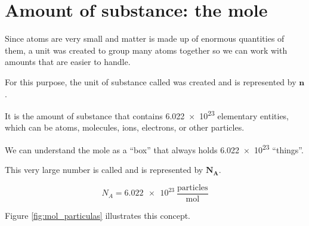 \section{Amount of substance: the mole}

Since atoms are very small and matter is made up of enormous quantities of them, a unit was created to group many atoms together so we can work with amounts that are easier to handle.

For this purpose, the unit of substance called  was created and is represented by \( \bm{n} \).

\begin{definition}[Mole]
    It is the amount of substance that contains \num{6.022e23} elementary entities, which can be atoms, molecules, ions, electrons, or other particles.
\end{definition}

We can understand the mole as a ``box'' that always holds \num{6.022e23} ``things''.

This very large number is called  and is represented by \( \bm{N_A} \).

\begin{equation*}
    N_A = \num{6.022e23}\ \dfrac{\text{particles}}{\unit{\mol}}
\end{equation*}

Figure \eqref{fig:mol_particulas} illustrates this concept.

